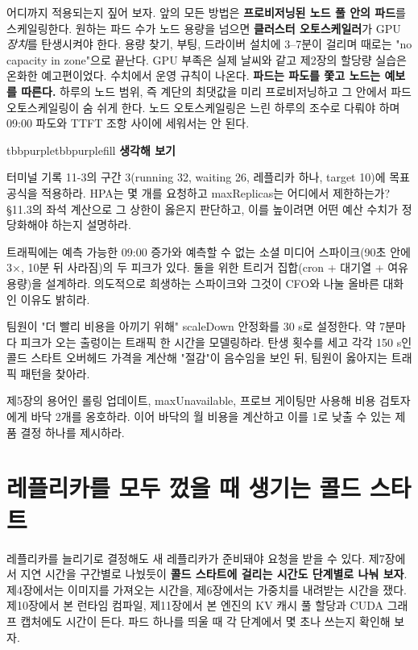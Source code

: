 어디까지 적용되는지 짚어 보자. 앞의 모든 방법은 \textbf{프로비저닝된 노드 풀 안의 파드}를 스케일링한다. 원하는 파드 수가 노드 용량을 넘으면 \textbf{클러스터 오토스케일러}가 GPU \textit{장치}를 탄생시켜야 한다. 용량 찾기, 부팅, 드라이버 설치에 3–7분이 걸리며 때로는 "no capacity in zone"으로 끝난다. GPU 부족은 실제 날씨와 같고 제2장의 할당량 실습은 온화한 예고편이었다. 수치에서 운영 규칙이 나온다. \textbf{파드는 파도를 쫓고 노드는 예보를 따른다.} 하루의 노드 범위, 즉 계단의 최댓값을 미리 프로비저닝하고 그 안에서 파드 오토스케일링이 숨 쉬게 한다. 노드 오토스케일링은 느린 하루의 조수로 다뤄야 하며 09:00 파도와 TTFT 조항 사이에 세워서는 안 된다.

\begin{calloutbox}{tbbpurple}{tbbpurplefill}
{\normalsize\bfseries\color{tbbpurple}생각해 보기}\par\vspace{3pt}
\begin{tbbitemize}
  \item 터미널 기록 11-3의 구간 3(running 32, waiting 26, 레플리카 하나, target 10)에 목표 공식을 적용하라. HPA는 몇 개를 요청하고 maxReplicas는 어디에서 제한하는가? §11.3의 좌석 계산으로 그 상한이 옳은지 판단하고, 이를 높이려면 어떤 예산 수치가 정당화해야 하는지 설명하라.
  \item 트래픽에는 예측 가능한 09:00 증가와 예측할 수 없는 소셜 미디어 스파이크(90초 안에 3×, 10분 뒤 사라짐)의 두 피크가 있다. 둘을 위한 트리거 집합(cron + 대기열 + 여유 용량)을 설계하라. 의도적으로 희생하는 스파이크와 그것이 CFO와 나눌 올바른 대화인 이유도 밝히라.
  \item 팀원이 "더 빨리 비용을 아끼기 위해" scaleDown 안정화를 30 s로 설정한다. 약 7분마다 피크가 오는 출렁이는 트래픽 한 시간을 모델링하라. 탄생 횟수를 세고 각각 150 s인 콜드 스타트 오버헤드 가격을 계산해 "절감"이 음수임을 보인 뒤, 팀원이 옳아지는 트래픽 패턴을 찾아라.
  \item 제5장의 용어인 롤링 업데이트, maxUnavailable, 프로브 게이팅만 사용해 비용 검토자에게 바닥 2개를 옹호하라. 이어 바닥의 월 비용을 계산하고 이를 1로 낮출 수 있는 제품 결정 하나를 제시하라.
\end{tbbitemize}
\end{calloutbox}

\section{레플리카를 모두 껐을 때 생기는 콜드 스타트}

레플리카를 늘리기로 결정해도 새 레플리카가 준비돼야 요청을 받을 수 있다. 제7장에서 지연 시간을 구간별로 나눴듯이 \textbf{콜드 스타트에 걸리는 시간도 단계별로 나눠 보자}. 제4장에서는 이미지를 가져오는 시간을, 제6장에서는 가중치를 내려받는 시간을 쟀다. 제10장에서 본 런타임 컴파일, 제11장에서 본 엔진의 KV 캐시 풀 할당과 CUDA 그래프 캡처에도 시간이 든다. 파드 하나를 띄울 때 각 단계에서 몇 초나 쓰는지 확인해 보자.

